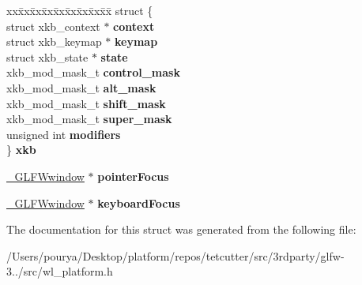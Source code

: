 \begin{DoxyCompactItemize}
\item 
\hypertarget{struct__GLFWlibraryWayland_ab5a7683e66555890e0b432ebb089ef5a}{}\begin{tabbing}
xx\=xx\=xx\=xx\=xx\=xx\=xx\=xx\=xx\=\kill
struct \{\\
\>struct xkb\_context $\ast$ {\bfseries context}\\
\>struct xkb\_keymap $\ast$ {\bfseries keymap}\\
\>struct xkb\_state $\ast$ {\bfseries state}\\
\>xkb\_mod\_mask\_t {\bfseries control\_mask}\\
\>xkb\_mod\_mask\_t {\bfseries alt\_mask}\\
\>xkb\_mod\_mask\_t {\bfseries shift\_mask}\\
\>xkb\_mod\_mask\_t {\bfseries super\_mask}\\
\>unsigned int {\bfseries modifiers}\\
\} {\bfseries xkb}\label{struct__GLFWlibraryWayland_ab5a7683e66555890e0b432ebb089ef5a}
\\

\end{tabbing}\item 
\hypertarget{struct__GLFWlibraryWayland_a6504e83b31618fd79369d278408496b8}{}\hyperlink{struct__GLFWwindow}{\+\_\+\+G\+L\+F\+Wwindow} $\ast$ {\bfseries pointer\+Focus}\label{struct__GLFWlibraryWayland_a6504e83b31618fd79369d278408496b8}

\item 
\hypertarget{struct__GLFWlibraryWayland_a150674da20d6497dec4d66080edb4ed7}{}\hyperlink{struct__GLFWwindow}{\+\_\+\+G\+L\+F\+Wwindow} $\ast$ {\bfseries keyboard\+Focus}\label{struct__GLFWlibraryWayland_a150674da20d6497dec4d66080edb4ed7}

\end{DoxyCompactItemize}


The documentation for this struct was generated from the following file\+:\begin{DoxyCompactItemize}
\item 
/\+Users/pourya/\+Desktop/platform/repos/tetcutter/src/3rdparty/glfw-\/3../src/wl\+\_\+platform.\+h\end{DoxyCompactItemize}

